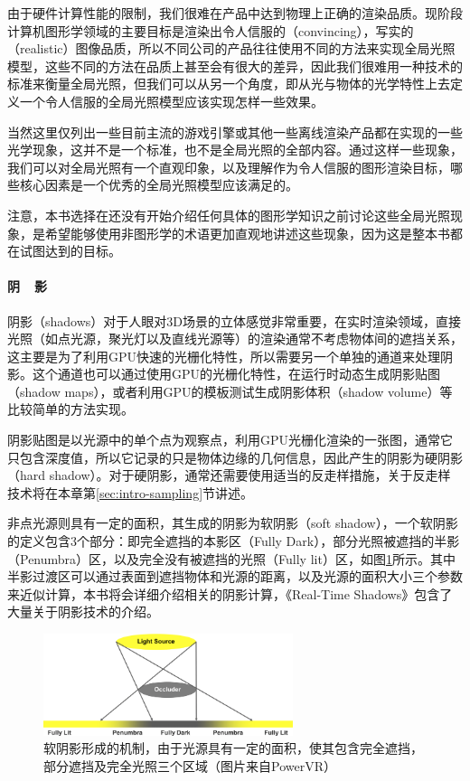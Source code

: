 由于硬件计算性能的限制，我们很难在产品中达到物理上正确的渲染品质。现阶段计算机图形学领域的主要目标是渲染出令人信服的（convincing），写实的（realistic）图像品质，所以不同公司的产品往往使用不同的方法来实现全局光照模型，这些不同的方法在品质上甚至会有很大的差异，因此我们很难用一种技术的标准来衡量全局光照，但我们可以从另一个角度，即从光与物体的光学特性上去定义一个令人信服的全局光照模型应该实现怎样一些效果。

当然这里仅列出一些目前主流的游戏引擎或其他一些离线渲染产品都在实现的一些光学现象，这并不是一个标准，也不是全局光照的全部内容。通过这样一些现象，我们可以对全局光照有一个直观印象，以及理解作为令人信服的图形渲染目标，哪些核心因素是一个优秀的全局光照模型应该满足的。

注意，本书选择在还没有开始介绍任何具体的图形学知识之前讨论这些全局光照现象，是希望能够使用非图形学的术语更加直观地讲述这些现象，因为这是整本书都在试图达到的目标。



\paragraph{阴~~影}
阴影（shadows）对于人眼对3D场景的立体感觉非常重要，在实时渲染领域，直接光照（如点光源，聚光灯以及直线光源等）的渲染通常不考虑物体间的遮挡关系，这主要是为了利用GPU快速的光栅化特性，所以需要另一个单独的通道来处理阴影。这个通道也可以通过使用GPU的光栅化特性，在运行时动态生成阴影贴图（shadow maps），或者利用GPU的模板测试生成阴影体积（shadow volume）等比较简单的方法实现。

阴影贴图是以光源中的单个点为观察点，利用GPU光栅化渲染的一张图，通常它只包含深度值，所以它记录的只是物体边缘的几何信息，因此产生的阴影为硬阴影（hard shadow）。对于硬阴影，通常还需要使用适当的反走样措施，关于反走样技术将在本章第\ref{sec:intro-sampling}节讲述。

非点光源则具有一定的面积，其生成的阴影为软阴影（soft shadow），一个软阴影的定义包含3个部分：即完全遮挡的本影区（Fully Dark），部分光照被遮挡的半影（Penumbra）区，以及完全没有被遮挡的光照（Fully lit）区，如图\ref{f:intro-shadow}所示。其中半影过渡区可以通过表面到遮挡物体和光源的距离，以及光源的面积大小三个参数来近似计算，本书将会详细介绍相关的阴影计算，《Real-Time Shadows》\cite{b:rts}包含了大量关于阴影技术的介绍。

\begin{figure}
\sidecaption
	\includegraphics[width=0.65\textwidth]{figures/intro/shadow}
	\caption{软阴影形成的机制，由于光源具有一定的面积，使其包含完全遮挡，部分遮挡及完全光照三个区域（图片来自PowerVR）}
	\label{f:intro-shadow}
\end{figure}




